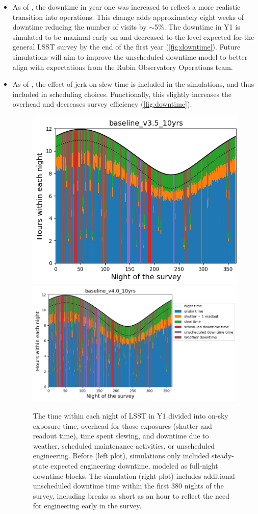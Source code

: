 
\begin{itemize}
\item As of , the downtime in year one was increased to reflect a more realistic transition into operations. This change adds approximately eight weeks of downtime reducing the number of visits by $\sim$5\%. The downtime in Y1 is simulated to be maximal early on and decreased to the level expected for the general LSST survey by the end of the first year (\autoref{fig:downtime}). Future simulations will aim to improve the unscheduled downtime model to better align with expectations from the Rubin Observatory Operations team. 

\item As of , the effect of jerk on slew time is included in the simulations, and thus included in scheduling choices. Functionally, this slightly increases the overhead and decreases survey efficiency (\autoref{fig:downtime}).

\begin{figure}[!h]
    \centering
    \includegraphics[height=0.33\linewidth]{figures/downtime_v3_5_year1.png}
    \includegraphics[height=0.32\linewidth]{figures/downtime_v4_0_year1.png}
    \caption{The time within each night of LSST in Y1 divided into on-sky exposure time, overhead for those exposures (shutter and readout time), time spent slewing, and downtime due to weather, scheduled maintenance activities, or unscheduled engineering. Before  (left plot), simulations only included steady-state expected engineering downtime, modeled as full-night downtime blocks. The  simulation (right plot) includes additional unscheduled downtime time within the first 380 nights of the survey, including breaks as short as an hour to reflect the need for engineering early in the survey. }
    \label{fig:downtime}
\end{figure}



\end{itemize}
